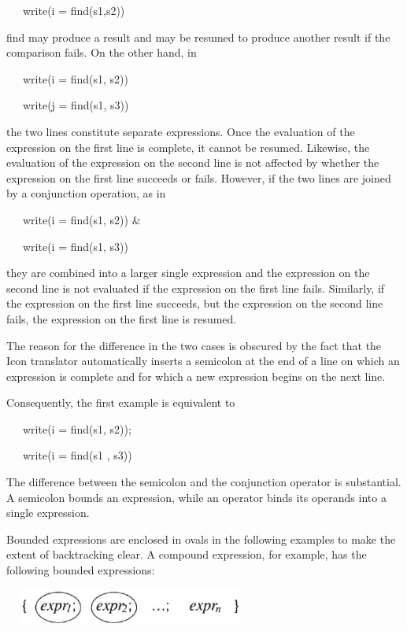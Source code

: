 {\ttfamily\mdseries
\ \ \ write(i = find(s1,s2))}

\noindent find may produce a result and may be resumed to produce
another result if the comparison fails. On the other hand, in

{\ttfamily\mdseries
\ \ \ write(i = find(s1, s2))}

{\ttfamily\mdseries
\ \ \ write(j = find(s1, s3))}

\noindent the two lines constitute separate expressions. Once the
evaluation of the expression on the first line is complete, it cannot
be resumed. Likewise, the evaluation of the expression on the second
line is not affected by whether the expression on the first line
succeeds or fails. However, if the two lines are joined by a
conjunction operation, as in

{\ttfamily\mdseries
\ \ \ write(i = find(s1, s2)) \&}

{\ttfamily\mdseries
\ \ \ write(i = find(s1, s3))}

\noindent they are combined into a larger single expression and the
expression on the second line is not evaluated if the expression on
the first line fails. Similarly, if the expression on the first line
succeeds, but the expression on the second line fails, the expression
on the first line is resumed.

The reason for the difference in the two cases is obscured by the fact
that the Icon translator automatically inserts a semicolon at the end
of a line on which an expression is complete and for which a new
expression begins on the next line.

Consequently, the first example is equivalent to

{\ttfamily\mdseries
\ \ \ write(i = find(s1, s2));}

{\ttfamily\mdseries
\ \ \ write(i = find(s1 , s3))}

The difference between the semicolon and the conjunction operator is
substantial. A semicolon bounds an expression, while an operator binds
its operands into a single expression.

Bounded expressions are enclosed in ovals in the following examples to
make the extent of backtracking clear. A compound expression, for
example, has the following bounded expressions:

\begin{center}
\includegraphics[width=3.2819in,height=0.4736in]{ib-img/ib-img057.jpg}
\end{center}

